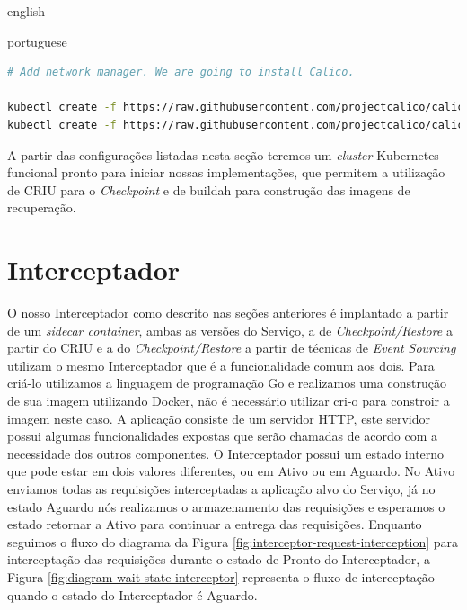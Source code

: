 \begin{otherlanguage*}{english}
\begin{otherlanguage*}{portuguese}
\begin{lstlisting}[language=bash,caption={Inicialização do Kubernetes, configuração de acesso para o kubectl e instalação do administrador de rede para Pods Calico.},label={listing:kubernetes-conf}]
# Add network manager. We are going to install Calico.

kubectl create -f https://raw.githubusercontent.com/projectcalico/calico/v3.26.1/manifests/tigera-operator.yaml
kubectl create -f https://raw.githubusercontent.com/projectcalico/calico/v3.26.1/manifests/custom-resources.yaml
\end{lstlisting}

A partir das configurações listadas nesta seção teremos um \textit{cluster} Kubernetes funcional
pronto para iniciar nossas implementações, que permitem a utilização de CRIU para o \textit{Checkpoint}
e de buildah para construção das imagens de recuperação.

\section{Interceptador}

O nosso Interceptador como descrito nas seções anteriores é implantado a partir de um
\textit{sidecar container}, ambas as versões do Serviço, a de \textit{Checkpoint/Restore}
a partir do CRIU e a do \textit{Checkpoint/Restore} a partir de técnicas de
\textit{Event Sourcing} utilizam o mesmo Interceptador que é a funcionalidade comum aos
dois. Para criá-lo utilizamos a linguagem de programação Go e
realizamos uma construção de sua imagem utilizando Docker, não é necessário utilizar
cri-o para constroir a imagem neste caso. A aplicação consiste de um servidor HTTP,
este servidor possui algumas funcionalidades expostas que serão chamadas de acordo com
a necessidade dos outros componentes. O Interceptador possui um estado interno que pode
estar em dois valores diferentes, ou em Ativo ou em Aguardo. No Ativo enviamos todas
as requisições interceptadas a aplicação alvo do Serviço, já no estado Aguardo nós
realizamos o armazenamento das requisições e esperamos o estado retornar a Ativo para
continuar a entrega das requisições. Enquanto seguimos o fluxo do diagrama da Figura
\ref{fig:interceptor-request-interception} para interceptação das requisições durante
o estado de Pronto do Interceptador, a Figura \ref{fig:diagram-wait-state-interceptor}
representa o fluxo de interceptação quando o estado do Interceptador é Aguardo.


\end{otherlanguage*}
\end{otherlanguage*}
